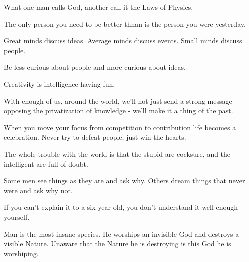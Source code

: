\documentclass[12pt,a4paper,twoside,openright]{report}
\newcounter{def}
\theoremstyle{definition}
\theoremstyle{itexmp}
\numberwithin{equation}{section}
\begin{document}
 	\begin{fquote}What one man calls God, another call it the Laws of Physics.
 	\end{fquote}
 	
 	\begin{fquote}[?]The only person you need to be better thhan is the person you were yesterday.
 	\end{fquote}
 	
 	\begin{fquote}Great minds discuss ideas. Average minds discuss events. Small minds discuss people.
 	\end{fquote}
 	
 	\begin{fquote}Be less curious about people and more curious about ideas.
 	\end{fquote}
 	
 	\begin{fquote}Creativity is intelligence having fun.
 	\end{fquote}
 	
 	\begin{fquote}With enough of us, around the world, we'll not just send a strong message opposing the privatization of knowledge - we'll make it a thing of the past.
 	\end{fquote}
 	
 	\begin{fquote}[Buddha]When you move your focus from competition to contribution life becomes a celebration. Never try to defeat people, just win the hearts.
 	\end{fquote}
 	
 	\begin{fquote}The whole trouble with the world is that the stupid are cocksure, and the intelligent are full of doubt.
 	\end{fquote}
 	
 	\begin{fquote}Some men see things as they are and ask why. Others dream things that never were and ask why not.
 	\end{fquote}
 	
 	\begin{fquote}If you can't explain it to a six year old, you don't understand it well enough yourself.
 	\end{fquote}
 	
 	\begin{fquote}Man is the most insane species. He worships an invisible God and destroys a visible Nature. Unaware that the Nature he is destroying is this God he is worshiping.
 	\end{fquote}
 	
\end{document}

